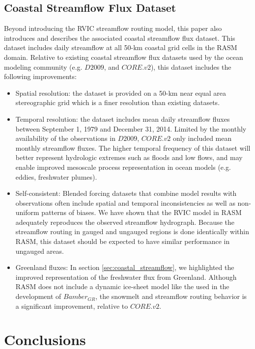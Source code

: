 \documentclass[jgrga, draft]{agutex}
\begin{document}
\begin{article}
\subsection{Coastal Streamflow Flux Dataset}
Beyond introducing the RVIC streamflow routing model, this paper also introduces and describes the associated coastal streamflow flux dataset.
This dataset includes daily streamflow at all 50-km coastal grid cells in the RASM domain.
Relative to existing coastal streamflow flux datasets used by the ocean modeling community (e.g. $D2009$, and $CORE.v2$), this dataset includes the following improvements:

\begin{itemize}[leftmargin=+.5in]
  \item Spatial resolution: the dataset is provided on a 50-km near equal area stereographic grid which is a finer resolution than existing datasets.
  \item Temporal resolution: the dataset includes mean daily streamflow fluxes between September 1, 1979 and December 31, 2014. Limited by the monthly availability of the observations in $D2009$, $CORE.v2$ only included mean monthly streamflow fluxes.
  The higher temporal frequency of this dataset will better represent hydrologic extremes such as floods and low flows, and may enable improved mesoscale process representation in ocean models (e.g. eddies, freshwater plumes).
  \item Self-consistent: Blended forcing datasets that combine model results with observations often include spatial and temporal inconsistencies as well as non-uniform patterns of biases. We have shown that the RVIC model in RASM adequately reproduces the observed streamflow hydrograph. Because the streamflow routing in gauged and ungauged regions is done identically within RASM, this dataset should be expected to have similar performance in ungauged areas.
  \item Greenland fluxes: In section \ref{sec:coastal_streamflow}, we highlighted the improved representation of the freshwater flux from Greenland. Although RASM does not include a dynamic ice-sheet model like the used in the development of $Bamber_{GR}$, the snowmelt and streamflow routing behavior is a significant improvement, relative to $CORE.v2$.
\end{itemize}

\section{Conclusions}
\label{sec:conclusions}


\end{article}
\end{document}
